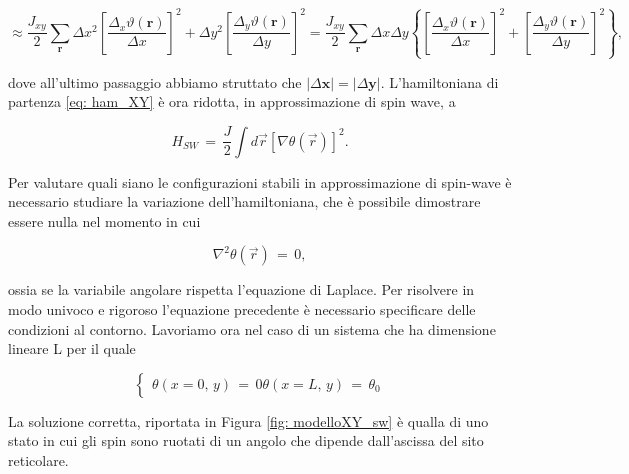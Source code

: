 \begin{equation*}
    \approx \frac{J_{xy}}{2} \sum_{\mathbf{r}} \Delta x^2 \left[ \frac{\Delta_x \vartheta (\mathbf{r})}{\Delta x} \right]^2 + 
    \Delta y^2 \left[ \frac{\Delta_y \vartheta (\mathbf{r})}{\Delta y} \right]^2 = \frac{J_{xy}}{2} \sum_{\mathbf{r}} \Delta x 
    \Delta y  \left\{ \left[ \frac{\Delta_x \vartheta (\mathbf{r})}{\Delta x} \right]^2 + \left[ \frac{\Delta_y \vartheta 
    (\mathbf{r})}{\Delta y} \right]^2 \right\},
\end{equation*}

dove all'ultimo passaggio abbiamo struttato che $|\Delta \mathbf{x}| = |\Delta \mathbf{y}|$. L'hamiltoniana di partenza \eqref{eq: ham_XY} 
è ora ridotta, in approssimazione di spin wave, a 

\begin{equation}
    H_{SW}\,=\,\frac{J}{2}\int d\vec{r} \left[\nabla \theta \left(\vec{r}\right)\right]^2.
    \label{eq: ham_XY_SW}
\end{equation}

Per valutare quali siano le configurazioni stabili in approssimazione di spin-wave è necessario studiare la variazione 
dell'hamiltoniana, che è possibile dimostrare essere nulla nel momento in cui 

\begin{equation}
    \nabla^2 \theta \left(\vec{r}\right)\,=\,0, 
    \label{eq: LE}
\end{equation}

ossia se la variabile angolare rispetta l'equazione di Laplace. Per risolvere in modo univoco e rigoroso l'equazione precedente è 
necessario specificare delle condizioni al contorno. Lavoriamo ora nel caso di un sistema che ha dimensione lineare L per il quale 

\begin{equation}
    \begin{cases}
        \theta\left(x=0,\,y\right)\,=\,0
        \theta\left(x=L,\,y\right)\,=\,\theta_0
    \end{cases}
    \label{eq: cont_LE}
\end{equation}

La soluzione corretta, riportata in Figura \ref{fig: modelloXY_sw} è qualla di uno stato in cui gli spin sono ruotati di un angolo che dipende dall'ascissa del sito reticolare. 

